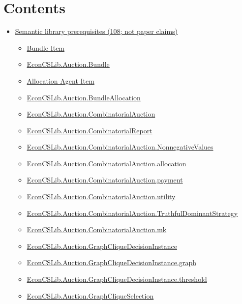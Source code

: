\documentclass[10pt]{article}
\begin{document}
\section*{Contents}
\begin{itemize}[leftmargin=1.2em]
\item \hyperlink{library-section-982ca190539c045c}{Semantic library prerequisites (108; not paper claims)}
\begin{itemize}[leftmargin=1.2em]
\item \hyperlink{library-prerequisite-3240074e96589b21}{Bundle Item}
\item \hyperlink{library-prerequisite-6b87abe0a59f452f}{EconCSLib.Auction.Bundle}
\item \hyperlink{library-prerequisite-9933ac127bcc0808}{Allocation Agent Item}
\item \hyperlink{library-prerequisite-1234a7c1778f1d99}{EconCSLib.Auction.BundleAllocation}
\item \hyperlink{library-prerequisite-30d0c2129a57694a}{EconCSLib.Auction.CombinatorialAuction}
\item \hyperlink{library-prerequisite-9042950dde969518}{EconCSLib.Auction.CombinatorialReport}
\item \hyperlink{library-prerequisite-9dcc4af3466e7409}{EconCSLib.Auction.CombinatorialAuction.NonnegativeValues}
\item \hyperlink{library-prerequisite-88ffd189fbedad49}{EconCSLib.Auction.CombinatorialAuction.allocation}
\item \hyperlink{library-prerequisite-b16439211061ac52}{EconCSLib.Auction.CombinatorialAuction.payment}
\item \hyperlink{library-prerequisite-80ead5d8da90d4dd}{EconCSLib.Auction.CombinatorialAuction.utility}
\item \hyperlink{library-prerequisite-cc5d52410b3b61b2}{EconCSLib.Auction.CombinatorialAuction.TruthfulDominantStrategy}
\item \hyperlink{library-prerequisite-4dfda790db63e3cc}{EconCSLib.Auction.CombinatorialAuction.mk}
\item \hyperlink{library-prerequisite-76bebac34aa62bbf}{EconCSLib.Auction.GraphCliqueDecisionInstance}
\item \hyperlink{library-prerequisite-f14583988e1a7ef8}{EconCSLib.Auction.GraphCliqueDecisionInstance.graph}
\item \hyperlink{library-prerequisite-1d6b539f7c714cfc}{EconCSLib.Auction.GraphCliqueDecisionInstance.threshold}
\item \hyperlink{library-prerequisite-d39a01df2635c862}{EconCSLib.Auction.GraphCliqueSelection}

\end{itemize}
\end{itemize}
\end{document}
